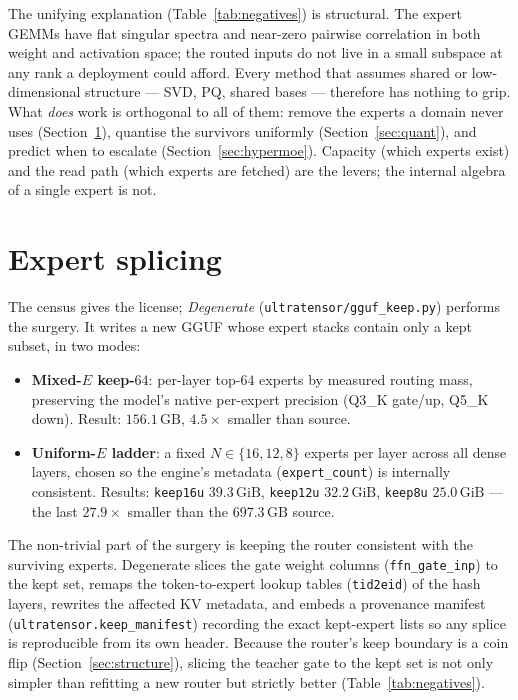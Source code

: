 \documentclass[11pt]{article}
\newcommand{\keepm}[1]{\texttt{keep#1}}
\newcommand{\code}[1]{\texttt{#1}}
\newcommand{\gib}{\,\textrm{GiB}}
\newcommand{\gb}{\,\textrm{GB}}
\begin{document}
The unifying explanation (Table~\ref{tab:negatives}) is structural. The expert
GEMMs have flat singular spectra and near-zero pairwise correlation in both
weight and activation space; the routed inputs do not live in a small subspace at
any rank a deployment could afford. Every method that assumes shared or
low-dimensional structure --- SVD, PQ, shared bases --- therefore has nothing to
grip. What \emph{does} work is orthogonal to all of them: remove the experts a
domain never uses (Section~\ref{sec:splice}), quantise the survivors uniformly
(Section~\ref{sec:quant}), and predict when to escalate
(Section~\ref{sec:hypermoe}). Capacity (which experts exist) and the read path
(which experts are fetched) are the levers; the internal algebra of a single
expert is not.

\section{Expert splicing}
\label{sec:splice}

The census gives the license; \emph{Degenerate} (\code{ultratensor/gguf\_keep.py})
performs the surgery. It writes a new GGUF whose expert stacks contain only a
kept subset, in two modes:

\begin{itemize}[leftmargin=1.4em]
  \item \textbf{Mixed-$E$ keep-$64$}: per-layer top-$64$ experts by measured
    routing mass, preserving the model's native per-expert precision (Q3\_K
    gate/up, Q5\_K down). Result: $156.1\gb{}$, $4.5\times$ smaller than source.
  \item \textbf{Uniform-$E$ ladder}: a fixed $N\in\{16,12,8\}$ experts per layer
    across all dense layers, chosen so the engine's metadata
    (\code{expert\_count}) is internally consistent. Results: \keepm{16u}
    $39.3\gib{}$, \keepm{12u} $32.2\gib{}$, \keepm{8u} $25.0\gib{}$ --- the last
    $27.9\times$ smaller than the $697.3\gb{}$ source.
\end{itemize}

The non-trivial part of the surgery is keeping the router consistent with the
surviving experts. Degenerate slices the gate weight columns
(\code{ffn\_gate\_inp}) to the kept set, remaps the token-to-expert lookup
tables (\code{tid2eid}) of the hash layers, rewrites the affected KV metadata,
and embeds a provenance manifest (\code{ultratensor.keep\_manifest}) recording
the exact kept-expert lists so any splice is reproducible from its own header.
Because the router's keep boundary is a coin flip (Section~\ref{sec:structure}),
slicing the teacher gate to the kept set is not only simpler than refitting a new
router but strictly better (Table~\ref{tab:negatives}).
\end{document}
